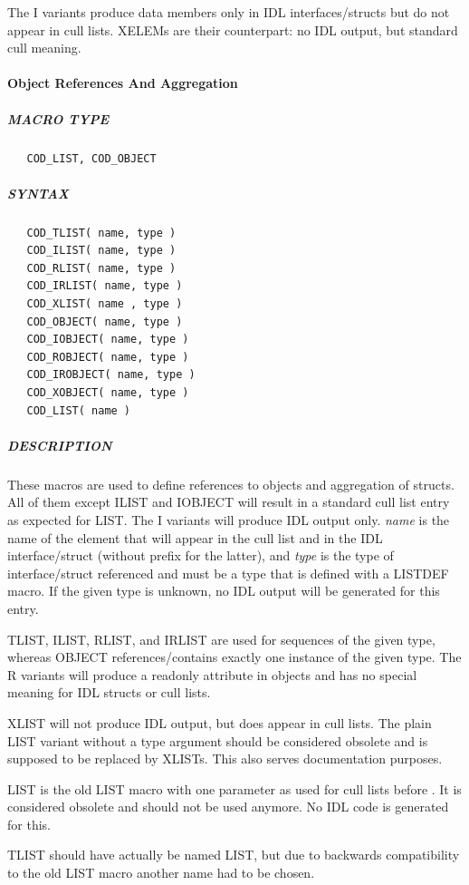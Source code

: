    The I variants produce data members only in IDL interfaces/structs but
   do not appear in cull lists. XELEMs are their counterpart: no IDL
   output, but standard cull meaning.

\paragraph{Object References And Aggregation}
\subparagraph{MACRO TYPE}
\begin{verbatim}
   COD_LIST, COD_OBJECT
\end{verbatim}

\subparagraph{SYNTAX}
\begin{verbatim}
   COD_TLIST( name, type )
   COD_ILIST( name, type )
   COD_RLIST( name, type )
   COD_IRLIST( name, type )
   COD_XLIST( name , type )
   COD_OBJECT( name, type )
   COD_IOBJECT( name, type )
   COD_ROBJECT( name, type )
   COD_IROBJECT( name, type )
   COD_XOBJECT( name, type )
   COD_LIST( name )
\end{verbatim}

\subparagraph{DESCRIPTION}
   These macros are used to define references to objects and aggregation of
   structs. All of them except ILIST and IOBJECT will result in a standard
   cull list entry as expected for LIST. The I variants will produce IDL output
   only. {\it name} is the name of the element that will appear in the cull list
   and in the IDL interface/struct (without prefix for the latter), and
   {\it type} is the type of interface/struct referenced and must be a type 
   that is defined with a LISTDEF macro. If the given type is unknown, no IDL 
   output will be generated for this entry.

   TLIST, ILIST, RLIST, and IRLIST  are used for sequences of the given type,
   whereas OBJECT references/contains exactly one instance of the given type.
   The R variants will produce a readonly attribute in objects and has no
   special meaning for IDL structs or cull lists.

   XLIST will not produce IDL output, but does appear in cull lists. The
   plain LIST variant without a type argument should be considered obsolete
   and is supposed to be replaced by XLISTs. This also serves documentation
   purposes.

   LIST is the old LIST macro with one parameter as
   used for cull lists before \qidl. It is considered obsolete and should
   not be used anymore. No IDL code is generated for this.

   TLIST should have actually be named LIST, but due to backwards
   compatibility to the old LIST macro another name had to be chosen.

